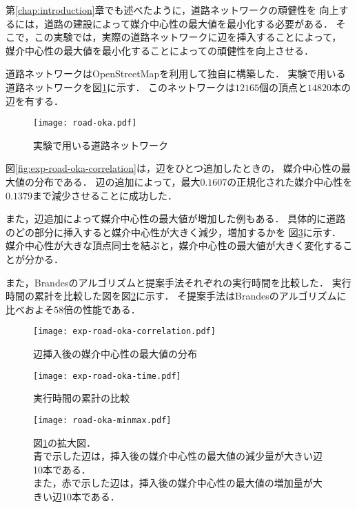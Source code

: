 第\ref{chap:introduction}章でも述べたように，道路ネットワークの頑健性を
向上するには，道路の建設によって媒介中心性の最大値を最小化する必要がある．
そこで，この実験では，実際の道路ネットワークに辺を挿入することによって，
媒介中心性の最大値を最小化することによっての頑健性を向上させる．

道路ネットワークはOpenStreetMap\cite{OpenStreetMap}を利用して独自に構築した．
実験で用いる道路ネットワークを図\ref{fig:road-okayama}に示す．
このネットワークは$12165$個の頂点と$14820$本の辺を有する．

\begin{figure}[tb]
  \centering
  \texttt{[image: road-oka.pdf]}
  \caption{実験で用いる道路ネットワーク}
  \label{fig:road-okayama}
\end{figure}

図\ref{fig:exp-road-oka-correlation}は，辺をひとつ追加したときの，
媒介中心性の最大値の分布である．
辺の追加によって，最大$0.1607$の正規化された媒介中心性を
$0.1379$まで減少させることに成功した．

また，辺追加によって媒介中心性の最大値が増加した例もある．
具体的に道路のどの部分に挿入すると媒介中心性が大きく減少，増加するかを
図\ref{fig:road-okayama-minmax}に示す．
媒介中心性が大きな頂点同士を結ぶと，媒介中心性の最大値が大きく変化することが分かる．

また，Brandesのアルゴリズムと提案手法それぞれの実行時間を比較した．
実行時間の累計を比較した図を図\ref{fig:exp-road-oka-time}に示す．
そ提案手法はBrandesのアルゴリズムに比べおよそ$58$倍の性能である．

\begin{figure}[tb]
  \centering
  \begin{minipage}{.45\textwidth}
    \texttt{[image: exp-road-oka-correlation.pdf]}
    \caption{辺挿入後の媒介中心性の最大値の分布}
    \label{fig:exp-road-oka-correlation}
  \end{minipage}\hfill
  \begin{minipage}{.45\textwidth}
    \texttt{[image: exp-road-oka-time.pdf]}
    \caption{実行時間の累計の比較}
    \label{fig:exp-road-oka-time}
  \end{minipage}
\end{figure}

\begin{figure}[tb]
  \centering
  \texttt{[image: road-oka-minmax.pdf]}
  \caption{
    図\ref{fig:road-okayama}の拡大図． \\
    青で示した辺は，挿入後の媒介中心性の最大値の減少量が大きい辺10本である． \\
    また，赤で示した辺は，挿入後の媒介中心性の最大値の増加量が大きい辺10本である．
  }
  \label{fig:road-okayama-minmax}
\end{figure}


